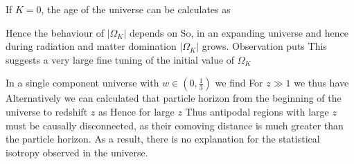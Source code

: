 \documentclass{article}
\begin{document}
\begin{prop}
If $K=0$, the age of the universe can be calculates as 
\end{prop}

\begin{example}\label{example:CSM:curvature problem}
Hence the behaviour of $|\Omega_K|$ depends on 
So, in an expanding universe 
and hence during radiation and matter domination $|\Omega_K|$ grows. Observation puts 
This suggests a very large fine tuning of the initial value of $\Omega_K$
\end{example}

\begin{example}\label{example:CSM:horizon problem}
In a single component universe with $w\in(0,\frac{1}{3})$ we find 
For $z\gg1$ we thus have 
Alternatively we can calculated that particle horizon from the beginning of the universe to redshift $z$ as 
Hence for large $z$
Thus antipodal regions with large $z$ must be causally disconnected, as their comoving distance is much greater than the particle horizon. As a result, there is no explanation for the statistical isotropy observed in the universe. 
\end{example}
\end{document}
